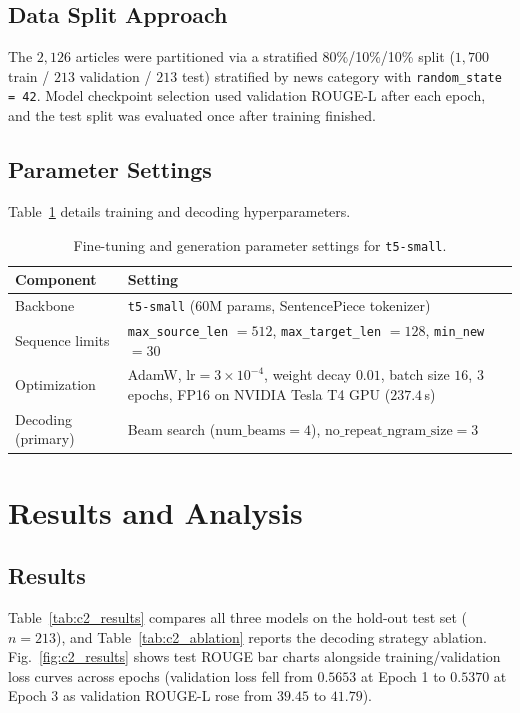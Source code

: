 \documentclass[conference,a4paper]{IEEEtran}
\begin{document}
\subsection{Data Split Approach}
The $2,126$ articles were partitioned via a stratified 80\%/10\%/10\% split ($1,700$ train / $213$ validation / $213$ test) stratified by news category with \texttt{random\_state = 42}. Model checkpoint selection used validation ROUGE-L after each epoch, and the test split was evaluated once after training finished.

\subsection{Parameter Settings}
Table~\ref{tab:c2_params} details training and decoding hyperparameters.

\begin{table}[htbp]
\centering
\caption{Fine-tuning and generation parameter settings for \texttt{t5-small}.}
\label{tab:c2_params}
\scriptsize
\renewcommand{\arraystretch}{0.92}
\begin{tabularx}{\columnwidth}{lX}
\toprule
\textbf{Component} & \textbf{Setting} \\
\midrule
Backbone & \texttt{t5-small} (60M params, SentencePiece tokenizer) \\
Sequence limits & \texttt{max\_source\_len} $= 512$, \texttt{max\_target\_len} $= 128$, \texttt{min\_new} $= 30$ \\
Optimization & AdamW, $\text{lr} = 3\times 10^{-4}$, weight decay $0.01$, batch size $16$, $3$ epochs, FP16 on NVIDIA Tesla T4 GPU ($237.4$\,s) \\
Decoding (primary) & Beam search ($\text{num\_beams}=4$), $\text{no\_repeat\_ngram\_size}=3$ \\
\bottomrule
\end{tabularx}
\end{table}

\section{Results and Analysis}
\subsection{Results}
Table~\ref{tab:c2_results} compares all three models on the hold-out test set ($n = 213$), and Table~\ref{tab:c2_ablation} reports the decoding strategy ablation. Fig.~\ref{fig:c2_results} shows test ROUGE bar charts alongside training/validation loss curves across epochs (validation loss fell from $0.5653$ at Epoch 1 to $0.5370$ at Epoch 3 as validation ROUGE-L rose from $39.45$ to $41.79$).
\end{document}
